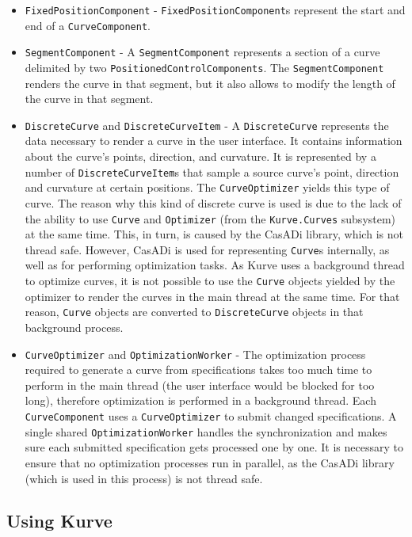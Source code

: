 \documentclass[a4paper]{article}
\begin{document}
\begin{itemize}
					\item \verb|FixedPositionComponent| - \verb|FixedPositionComponent|s represent the start and end of a \verb|CurveComponent|.
					\item \verb|SegmentComponent| - A \verb|SegmentComponent| represents a section of a curve delimited by two \verb|PositionedControlComponents|. The \verb|SegmentComponent| renders the curve in that segment, but it also allows to modify the length of the curve in that segment.
					\item \verb|DiscreteCurve| and \verb|DiscreteCurveItem| - A \verb|DiscreteCurve| represents the data necessary to render a curve in the user interface. It contains information about the curve's points, direction, and curvature. It is represented by a number of \verb|DiscreteCurveItem|s that sample a source curve's point, direction and curvature at certain positions. 
					The \verb|CurveOptimizer| yields this type of curve. The reason why this kind of discrete curve is used is due to the lack of the ability to use \verb|Curve| and \verb|Optimizer| (from the \verb|Kurve.Curves| subsystem) at the same time. This, in turn, is caused by the CasADi library, which is not thread safe. However, CasADi is used for representing \verb|Curve|s internally, as well as for performing optimization tasks.
					As Kurve uses a background thread to optimize curves, it is not possible to use the \verb|Curve| objects yielded by the optimizer to render the curves in the main thread at the same time. For that reason, \verb|Curve| objects are converted to \verb|DiscreteCurve| objects in that background process.
					\item \verb|CurveOptimizer| and \verb|OptimizationWorker| - The optimization process required to generate a curve from specifications takes too much time to perform in the main thread (the user interface would be blocked for too long), therefore optimization is performed in a background thread. Each \verb|CurveComponent| uses a \verb|CurveOptimizer| to submit changed specifications. A single shared \verb|OptimizationWorker| handles the synchronization and makes sure each submitted specification gets processed one by one. It is necessary to ensure that no optimization processes run in parallel, as the CasADi library (which is used in this process) is not thread safe.
				\end{itemize}

			\subsection{Using Kurve}
				
\end{document}
